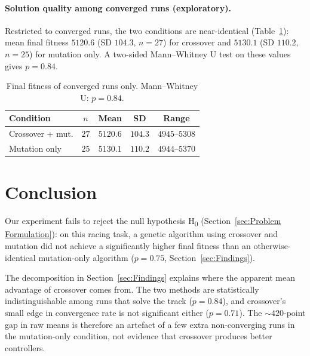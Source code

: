 \documentclass[a4paper, twocolumn]{article}
\begin{document}
\paragraph{Solution quality among converged runs (exploratory).}
Restricted to converged runs, the two conditions are near-identical
(Table~\ref{tab:quality}): mean final fitness $5120.6$ (SD $104.3$, $n = 27$) for crossover and
$5130.1$ (SD $110.2$, $n = 25$) for mutation only. A two-sided Mann--Whitney U test on these
values gives $p = 0.84$.

\begin{table}[ht]
    \centering
    \small
    \begin{tabular}{lcccc}
        \hline
        Condition & $n$ & Mean & SD & Range \\
        \hline
        Crossover + mut. & $27$ & $5120.6$ & $104.3$ & $4945$--$5308$ \\
        Mutation only    & $25$ & $5130.1$ & $110.2$ & $4944$--$5370$ \\
        \hline
    \end{tabular}
    \caption{Final fitness of converged runs only. Mann--Whitney U: $p = 0.84$.}
    \label{tab:quality}
\end{table}


\section{Conclusion\label{sec:Conclusion}}

Our experiment fails to reject the null hypothesis H\textsubscript{0}
(Section~\ref{sec:Problem Formulation}): 
on this racing task, a genetic algorithm using
crossover and mutation did not achieve a significantly higher final fitness than an
otherwise-identical mutation-only algorithm ($p = 0.75$, Section~\ref{sec:Findings}).

The decomposition in Section~\ref{sec:Findings} explains where the apparent mean advantage of
crossover comes from.
The two methods are statistically indistinguishable among runs that solve the track ($p = 0.84$),
and crossover's small edge in convergence rate is not significant either ($p = 0.71$).
The $\sim\!420$-point gap in raw means is therefore an artefact of a few extra
non-converging runs in the mutation-only condition, not evidence that crossover produces better
controllers.
\end{document}

